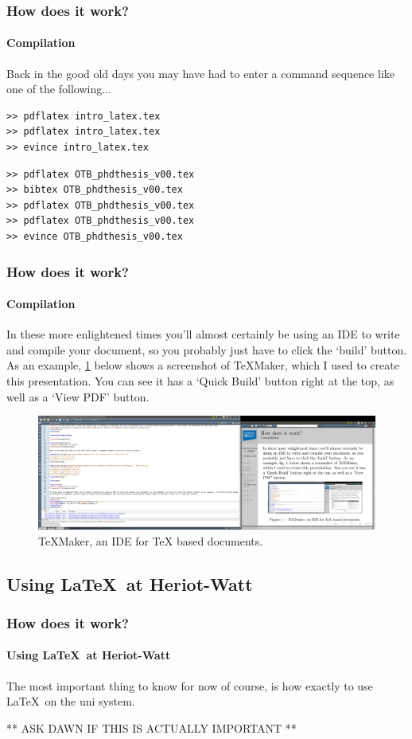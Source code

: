\documentclass{beamer}
\begin{document}
\lstset{language=bash}

\begin{frame}[fragile]
\frametitle{How does it work?}
\framesubtitle{Compilation}

Back in the good old days you may have had to enter a command sequence like one of the following...

\begin{lstlisting}[caption={Command sequence for this presentation.}, label={lst:1}]
>> pdflatex intro_latex.tex
>> pdflatex intro_latex.tex
>> evince intro_latex.tex
\end{lstlisting}

\begin{lstlisting}[caption={Command sequence for a document containing BibTeX references.}, label={lst:2}]
>> pdflatex OTB_phdthesis_v00.tex
>> bibtex OTB_phdthesis_v00.tex
>> pdflatex OTB_phdthesis_v00.tex
>> pdflatex OTB_phdthesis_v00.tex
>> evince OTB_phdthesis_v00.tex
\end{lstlisting}

\end{frame}

\begin{frame}
\frametitle{How does it work?}
\framesubtitle{Compilation}

In these more enlightened times you'll almost certainly be using an IDE to write and compile your document, so you probably just have to click the `build' button. As an example, \cref{fig:1} below shows a screenshot of TeXMaker, which I used to create this presentation. You can see it has a `Quick Build' button right at the top, as well as a `View PDF' button. 

\begin{figure}[h!]
\centering
\includegraphics[width=0.9\linewidth]{texmaker_scrn}
\caption{TeXMaker, an IDE for TeX based documents.}
\label{fig:1}
\end{figure}

\end{frame}

\subsection[HWU]{Using \LaTeX\ at Heriot-Watt}
\begin{frame}
\frametitle{How does it work?}
\framesubtitle{Using \LaTeX\ at Heriot-Watt}
The most important thing to know for now of course, is how exactly to use \LaTeX\ on the uni system.

** ASK DAWN IF THIS IS ACTUALLY IMPORTANT **
\end{frame}
\end{document}
